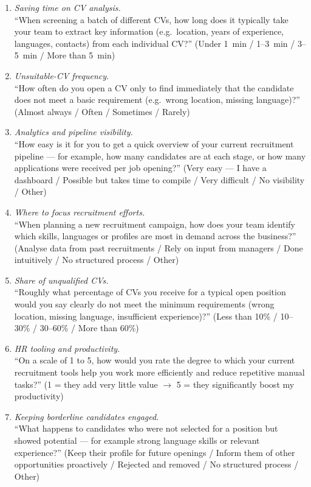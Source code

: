\begin{enumerate}
	\item \textit{Saving time on CV analysis.}\\
	``When screening a batch of different CVs, how long does it typically take
	your team to extract key information (e.g.\ location, years of experience,
	languages, contacts) from each individual CV?''
	(Under 1~min / 1--3~min / 3--5~min / More than 5~min)

	\item \textit{Unsuitable-CV frequency.}\\
	``How often do you open a CV only to find immediately that the candidate
	does not meet a basic requirement (e.g.\ wrong location, missing
	language)?''
	(Almost always / Often / Sometimes / Rarely)

	\item \textit{Analytics and pipeline visibility.}\\
	``How easy is it for you to get a quick overview of your current
	recruitment pipeline --- for example, how many candidates are at each
	stage, or how many applications were received per job opening?''
	(Very easy --- I have a dashboard / Possible but takes time to compile /
	Very difficult / No visibility / Other)

	\item \textit{Where to focus recruitment efforts.}\\
	``When planning a new recruitment campaign, how does your team identify
	which skills, languages or profiles are most in demand across the
	business?''
	(Analyse data from past recruitments / Rely on input from managers / Done
	intuitively / No structured process / Other)

	\item \textit{Share of unqualified CVs.}\\
	``Roughly what percentage of CVs you receive for a typical open position
	would you say clearly do not meet the minimum requirements (wrong
	location, missing language, insufficient experience)?''
	(Less than 10\% / 10--30\% / 30--60\% / More than 60\%)

	\item \textit{HR tooling and productivity.}\\
	``On a scale of 1 to 5, how would you rate the degree to which your current
	recruitment tools help you work more efficiently and reduce repetitive
	manual tasks?''
	(1 = they add very little value $\to$ 5 = they significantly boost my
	productivity)

	\item \textit{Keeping borderline candidates engaged.}\\
	``What happens to candidates who were not selected for a position but
	showed potential --- for example strong language skills or relevant
	experience?''
	(Keep their profile for future openings / Inform them of other
	opportunities proactively / Rejected and removed / No structured process /
	Other)


\end{enumerate}
